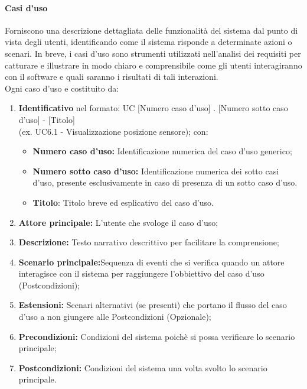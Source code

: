 \documentclass{article}
\begin{document}
\paragraph{Casi d'uso}
Forniscono una descrizione dettagliata delle funzionalità del sistema dal punto di vista degli utenti, identificando come il sistema risponde a determinate azioni o scenari. In breve, i casi d'uso sono strumenti utilizzati nell'analisi dei requisiti per catturare e illustrare in modo chiaro e comprensibile come gli utenti interagiranno con il software e quali saranno i risultati di tali interazioni.
\\ Ogni caso d'uso e costituito da:
\begin{enumerate}
    \item \textbf{Identificativo} nel formato: UC [Numero caso d'uso] . [Numero sotto caso d'uso] - [Titolo] \\ (ex. UC6.1 - Visualizzazione posizione sensore);
    con:
    \begin{itemize}
        \item \textbf{Numero caso d'uso:} Identificazione numerica del caso d'uso generico;
        \item \textbf{Numero sotto caso d'uso:} Identificazione numerica dei sotto casi d'uso, presente esclusivamente in caso di presenza di un sotto caso d'uso.
        \item \textbf{Titolo}: Titolo breve ed esplicativo del caso d'uso.
    \end{itemize}
    \item \textbf{Attore principale:} L'utente che svologe il caso d'uso;
    \item \textbf{Descrizione:} Testo narrativo descrittivo per facilitare la comprensione;
    \item \textbf{Scenario principale:}Sequenza di eventi che si verifica quando un attore interagisce con il sistema per raggiungere l'obbiettivo del caso d'uso (Postcondizioni);
    \item \textbf{Estensioni:} Scenari alternativi (se presenti) che portano il flusso del caso d'uso a non giungere alle Postcondizioni (Opzionale);
    \item \textbf{Precondizioni:} Condizioni del sistema poichè si possa verificare lo scenario principale;
    \item \textbf{Postcondizioni:} Condizioni del sistema una volta svolto lo scenario principale.
\end{enumerate}
\end{document}
